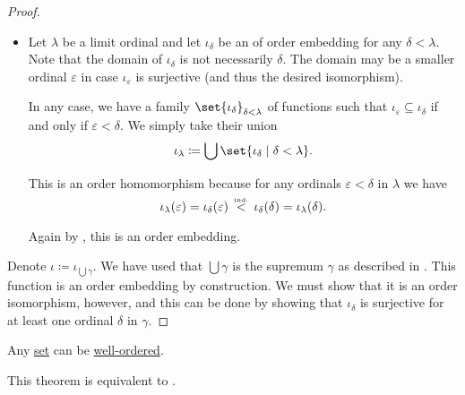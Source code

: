 \begin{proof}
\begin{itemize}
    \item Let \( \lambda \) be a limit ordinal and let \( \iota_\delta \) be an of order embedding for any \( \delta < \lambda \). Note that the domain of \( \iota_\delta \) is not necessarily \( \delta \). The domain may be a smaller ordinal \( \varepsilon \) in case \( \iota_\varepsilon \) is surjective (and thus the desired isomorphism).

    In any case, we have a family \( \set{ \iota_\delta }_{\delta < \lambda} \) of functions such that \( \iota_\varepsilon \subseteq \iota_\delta \) if and only if \( \varepsilon < \delta \). We simply take their union
    \begin{equation*}
      \iota_\lambda \coloneqq \bigcup \set{ \iota_\delta \given \delta < \lambda }.
    \end{equation*}

    This is an order homomorphism because for any ordinals \( \varepsilon < \delta \) in \( \lambda \) we have
    \begin{equation*}
      \iota_\lambda(\varepsilon)
      =
      \iota_\delta(\varepsilon)
      \reloset {\T{ind.}} <
      \iota_\delta(\delta)
      =
      \iota_\lambda(\delta).
    \end{equation*}

    Again by , this is an order embedding.
  \end{itemize}

  Denote \( \iota \coloneqq \iota_{\bigcup \gamma} \). We have used that \( \bigcup \gamma \) is the supremum \( \gamma \) as described in . This function is an order embedding by construction. We must show that it is an order isomorphism, however, and this can be done by showing that \( \iota_\delta \) is surjective for at least one ordinal \( \delta \) in \( \gamma \).
\end{proof}

\begin{theorem}\label{thm:well_ordering_principle}
  Any \hyperref[def:set]{set} can be \hyperref[def:well_ordered_set]{well-ordered}.

  This theorem is equivalent to .
\end{theorem}
